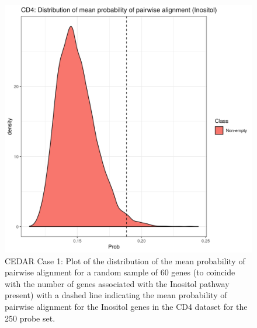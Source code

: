 \documentclass[12pt]{article} %
\begin{document}
	\begin{figure}[h]
		\centering
		\includegraphics[scale=0.75]{Images/Biology_data/Set_250/All_datasets/Mean_alignment_probability/CD4_KEGG_INOSITOL_PHOSPHATE_METABOLISM.png}
		\caption{CEDAR Case 1: Plot of the distribution of the mean probability of pairwise alignment for a random sample of 60 genes (to coincide with the number of genes associated with the Inositol pathway present) with a dashed line indicating the mean probability of pairwise alignment for the Inositol genes in the CD4 dataset for the 250 probe set.}
		\label{fig:results:cedar_1:mdi_cd4_inostiol_alignemnt_prob_distn}
	\end{figure}
\end{document}
